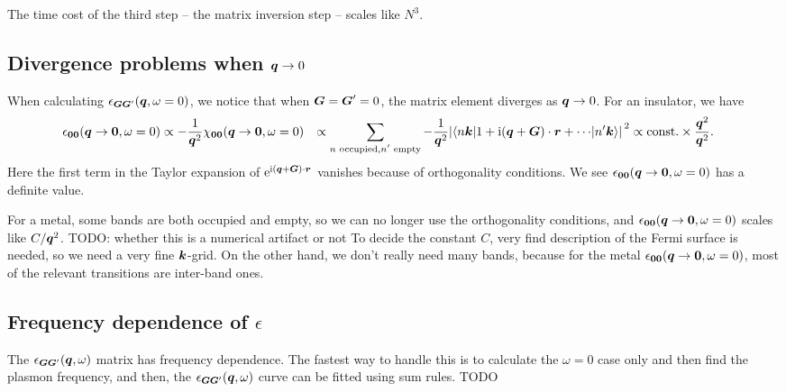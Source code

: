 \documentclass[hyperref, a4paper, 12pt]{report}
\newcommand*{\ii}{\mathrm{i}}
\newcommand*{\ee}{\mathrm{e}}
\newcommand*{\const}{\mathrm{const}}
\def\\{}%
\begin{document}
The time cost of the third step -- the matrix inversion step -- 
scales like $N^3$.

\subsection{Divergence problems when $\vb*{q} \to 0$}

When calculating $\epsilon_{\vb*{G} \vb*{G}'}(\vb*{q}, \omega = 0)$,
we notice that when $\vb*{G} = \vb*{G}' = 0$,
the matrix element diverges as $\vb*{q} \to 0$.
For an insulator, we have 
\begin{equation}
    \begin{aligned}
        \epsilon_{\vb*{0} \vb*{0}} (\vb*{q} \to \vb*{0}, \omega = 0)
        &\propto - \frac{1}{\vb*{q}^2} \chi_{\vb*{0} \vb*{0}} (\vb*{q} \to \vb*{0}, \omega = 0) \\
        &\propto \sum_{\text{$n$ occupied}, \text{$n'$ empty}} - \frac{1}{\vb*{q}^2} 
        \abs*{
            \mel**{n \vb*{k}}{1 + \ii (\vb*{q} + \vb*{G}) \cdot \vb*{r} + \cdots }{n' \vb*{k}}
        }^2 \\
        &\propto \const. \times \frac{\vb*{q}^2}{\vb*{q}^2}.
    \end{aligned}
\end{equation}
Here the first term in the Taylor expansion of $\ee^{\ii (\vb*{q} + \vb*{G}) \cdot \vb*{r}}$ vanishes
because of orthogonality conditions.
We see $\epsilon_{\vb*{0} \vb*{0}} (\vb*{q} \to \vb*{0}, \omega = 0)$
has a definite value.

For a metal, some bands are both occupied and empty,
so we can no longer use the orthogonality conditions,
and $\epsilon_{\vb*{0} \vb*{0}} (\vb*{q} \to \vb*{0}, \omega = 0)$ 
scales like $C / \vb*{q}^2$.
TODO: whether this is a numerical artifact or not 
To decide the constant $C$,
very find description of the Fermi surface is needed,
so we need a very fine $\vb*{k}$-grid.
On the other hand, 
we don't really need many bands,
because for the metal $\epsilon_{\vb*{0} \vb*{0}} (\vb*{q} \to \vb*{0}, \omega = 0)$,
most of the relevant transitions are inter-band ones.

\subsection{Frequency dependence of $\epsilon$}

The $\epsilon_{\vb*{G} \vb*{G}'}(\vb*{q}, \omega)$ matrix has frequency dependence.
The fastest way to handle this is to calculate the $\omega = 0$ case only 
and then find the plasmon frequency,
and then, the $\epsilon_{\vb*{G} \vb*{G}'}(\vb*{q}, \omega)$ curve 
can be fitted using sum rules. TODO 
\end{document}
